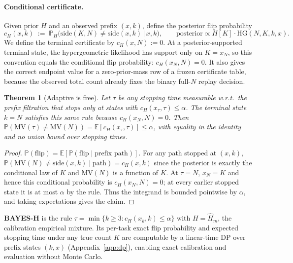 \documentclass{article}
\newtheorem{theorem}{Theorem}
\theoremstyle{definition}
\theoremstyle{remark}
\newcommand{\flip}{\mathrm{flip}}
\newcommand{\cert}{c_H}
\newcommand{\HG}{\mathrm{HG}}
\newcommand{\MV}{\mathrm{MV}}
\newcommand{\E}{\mathbb{E}}
\renewcommand{\P}{\mathbb{P}}
\begin{document}
\paragraph{Conditional certificate.}
Given prior $H$ and an observed prefix $(x,k)$, define the posterior flip
probability
\begin{equation}
\cert(x,k) \;:=\; \P_H\big(\mathrm{side}(K,N)\neq\mathrm{side}(x,k)\,\big|\,x,k\big),
\qquad \text{posterior} \propto H[K]\cdot\HG(N,K,k,x).
\label{eq:cond}
\end{equation}
We define the terminal certificate by $\cert(x,N):=0$. At a
posterior-supported terminal state, the hypergeometric likelihood has support
only on $K=x_N$, so this convention equals the conditional flip probability:
$\cert(x_N,N)=0$. It also gives the correct endpoint value for a
zero-prior-mass row of a frozen certificate table, because the observed total
count already fixes the binary full-$N$ replay decision.

\begin{theorem}[Adaptive is free]
\label{thm:tower}
Let $\tau$ be any stopping time measurable w.r.t.\ the prefix filtration that
stops only at states with $\cert(x_\tau,\tau)\le\alpha$. The terminal state
$k=N$ satisfies this same rule because $\cert(x_N,N)=0$. Then
$\P(\MV(\tau)\neq\MV(N)) = \E[\cert(x_\tau,\tau)] \le \alpha$,
with equality in the identity and no union bound over stopping times.
\end{theorem}
\begin{proof}
$\P(\flip)=\E[\P(\flip\mid\text{prefix path})]$. For any path stopped at
$(x,k)$, $\P(\MV(N)\neq\mathrm{side}(x,k)\mid\text{path})=\cert(x,k)$ since
the posterior is exactly the conditional law of $K$ and $\MV(N)$ is a
function of $K$. At $\tau=N$, $x_N=K$ and hence this conditional probability
is $\cert(x_N,N)=0$; at every earlier stopped state it is at most $\alpha$ by
the rule. Thus the integrand is bounded pointwise by $\alpha$, and taking
expectations gives the claim.
\end{proof}

\textbf{BAYES-H} is the rule $\tau=\min\{k\ge 3:\cert(x_k,k)\le\alpha\}$ with
$H=\widehat H_m$, the calibration empirical mixture. Its per-task exact flip
probability and expected stopping time under any true count $K$ are computable
by a linear-time DP over prefix states $(k,x)$ (Appendix~\ref{app:dp}),
enabling exact calibration and evaluation without Monte Carlo.
\end{document}
